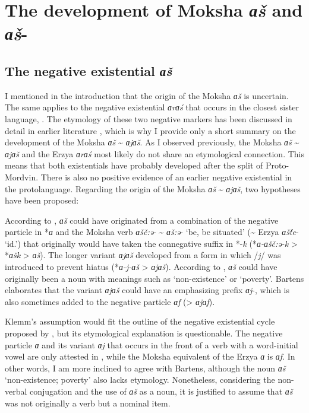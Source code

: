 \documentclass[output=paper]{langsci/langscibook}
\begin{document}
\section{The development of Moksha \textit{ɑš} and \textit{ɑš}-}\label{sec:2:7}

\subsection{The negative existential \textit{ɑš}}\label{sec:2:7.1}

I mentioned in the introduction that the origin of the Moksha \textit{ɑ\v
s} is uncertain. The same applies to the negative existential
\textit{ɑrɑś} that occurs in the closest sister language, .
The etymology of these two negative markers has been discussed in detail in
earlier literature \parencites[see][107--113]{Hamari2007}[477--479]{Hamari2013}, which is why I provide only a short summary on the development of the Moksha \textit{ɑš} {\textasciitilde} \textit{ɑjɑš}. As I observed previously, the Moksha \textit{ɑš} {\textasciitilde} \textit{ɑjɑš} and the Erzya \textit{ɑrɑś} most likely do not share an etymological connection. This means that both existentials have probably developed after the split of Proto-Mordvin. There is also no positive evidence of an earlier negative existential in the protolanguage. Regarding the origin of the Moksha \textit{ɑš} {\textasciitilde} \textit{ɑjɑš}, two hypotheses have been proposed:

\begin{exe}
 {According to \citet[388]{Klemm1934}, \textit{ɑš} could have
    originated from a combination of the negative particle in *\textit{ɑ} and the Moksha verb \textit{ɑšč:ə}- {\textasciitilde} \textit{ɑš:ə}- `be, be situated' ({\textasciitilde} Erzya \textit{ɑšťe}- `id.') that originally would have taken the connegative suffix in *-\textit{k} (*\textit{ɑ-ɑšč:ə-k} > *\textit{ɑšk} > \textit{ɑš}). The longer variant \textit{ɑjɑš} developed from a form in which /\textit{j}/ was introduced to prevent hiatus (*\textit{ɑ-j-ɑš} > \textit{ɑjɑš}).}
 {According to \citet[79]{Bartens1996}, \textit{ɑš} could have originally been a noun with meanings such as `non-existence' or `poverty'. Bartens elaborates that the variant \textit{ɑjɑš} could have an emphasizing prefix \textit{ɑj}-, which is also sometimes added to the negative particle \textit{ɑf} (> \textit{ɑjɑf}).}
\end{exe}

Klemm's assumption would fit the outline of the negative existential cycle proposed by \citet{Croft1991}, but its etymological explanation is questionable. The negative particle \textit{ɑ} and its variant \textit{ɑj} that occurs in the front of a verb with a word-initial vowel are only attested in , while the Moksha equivalent of the Erzya \textit{ɑ} is \textit{ɑf}. In other words, I am more inclined to agree with Bartens, although the noun \textit{ɑš} `non-existence; poverty' also lacks etymology. Nonetheless, considering the non-verbal conjugation and the use of \textit{ɑš} as a noun, it is justified to assume that \textit{ɑš} was not originally a verb but a nominal item. 
\end{document}
